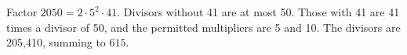 Factor $2050=2\cdot5^2\cdot41$. Divisors without 41 are at most 50. Those with 41 are 41 times a divisor of 50, and the permitted multipliers are 5 and 10. The divisors are 205,410, summing to $\boxed{615}$.
